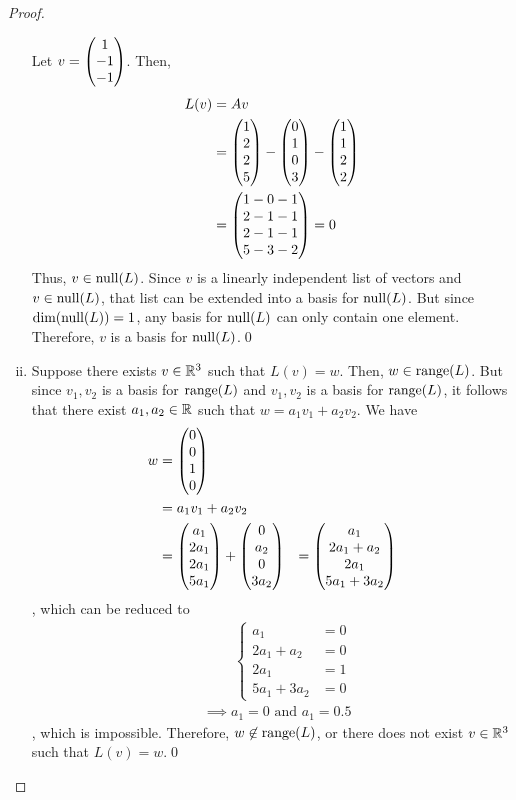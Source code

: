 \begin{proof}
\begin{enumerate}[(i)]
        Let $v=\begin{pmatrix} 1\\ -1\\ -1\end{pmatrix}$. Then,  
        \[
            \begin{aligned}
                L(v)
                &= Av\\
                &= \begin{pmatrix} 1\\ 2\\2 \\ 5\end{pmatrix}-\begin{pmatrix} 0\\ 1\\0 \\ 3\end{pmatrix}-\begin{pmatrix} 1\\ 1\\2 \\ 2\end{pmatrix}\\
                &= \begin{pmatrix} 1-0-1\\ 2-1-1\\2-1-1 \\ 5-3-2\end{pmatrix}=0
            \end{aligned}
        \]
        Thus, $v\in\textnormal{null}(L)$.
        Since $v$ is a linearly independent list of vectors and $v\in\textnormal{null}(L)$, that list can be extended into a basis for $\textnormal{null}(L)$.
        But since $\textnormal{dim}(\textnormal{null}(L))=1$, any basis for $\textnormal{null}(L)$ can only contain one element.
        Therefore, $v$ is a basis for $\textnormal{null}(L)$.\qed
        \item 
        Suppose there exists $v\in\mathbb R^3$ such that $L(v)=w$.
        Then, $w\in\textnormal{range}(L)$.
        But since $v_1,v_2$ is a basis for $\textnormal{range}(L)$ and $v_1,v_2$ is a basis for $\textnormal{range}(L)$, it follows that there exist $a_1,a_2\in\mathbb R$ such that $w=a_1v_1+a_2v_2$.
        We have 
        \[
            \begin{aligned}
                w
                &= \begin{pmatrix} 0\\ 0\\1 \\ 0\end{pmatrix}\\
                &= a_1v_1+a_2v_2\\
                &= \begin{pmatrix} a_1\\ 2a_1\\2a_1 \\ 5a_1\end{pmatrix}+\begin{pmatrix} 0\\ a_2\\0 \\ 3a_2\end{pmatrix} &= \begin{pmatrix} a_1\\ 2a_1+a_2\\2a_1 \\ 5a_1+3a_2\end{pmatrix}
            \end{aligned}
        \]
        , which can be reduced to 
        \begin{align*}
            &\qquad \ \begin{cases}
                a_1 &= 0\\
                2a_1+a_2 &= 0\\
                2a_1 &= 1\\
                5a_1+3a_2 &= 0
            \end{cases}\\
            &\implies a_1=0\text{ and } a_1=0.5
        \end{align*}
        , which is impossible.
        Therefore, $w\not\in\textnormal{range}(L)$, or there does not exist $v\in\mathbb R^3$ such that $L(v)=w$.\qed
    \end{enumerate}
    \renewcommand{\qedsymbol}{}
\end{proof}